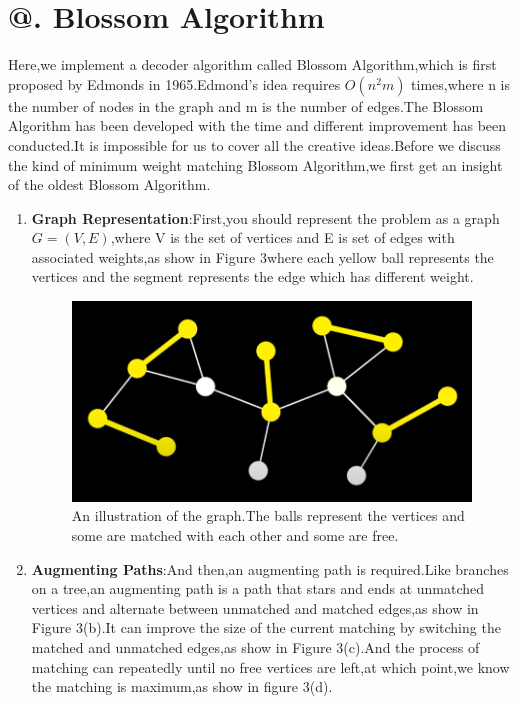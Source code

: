 \documentclass[
	a4paper, %
	10pt, %
	unnumberedsections, %
	twoside, %
]{LTJournalArticle}
\makeatletter
\newcommand{\Rmnum}[1]{\expandafter\@slowromancap\romannumeral #1@}
\makeatother
\begin{document}
\section{\Rmnum{3}. Blossom Algorithm}
	Here,we implement a decoder algorithm called Blossom Algorithm,which is first proposed by Edmonds in 1965.Edmond's idea requires $O(n^2m)$ times,where n is the number of nodes in the graph and m is the number of edges.The Blossom Algorithm has been developed with the time and different improvement has been conducted.It is impossible for us to cover all the creative ideas.Before we discuss the kind of minimum weight matching Blossom Algorithm,we first get an insight of the oldest Blossom Algorithm.
\begin{enumerate}
	\item \textbf{Graph Representation}:First,you should represent the problem as a graph $G=(V,E)$,where V is the set of vertices and E is set of edges with associated weights,as show in Figure 3where each yellow ball represents the vertices and the segment represents the edge which has different weight.
	\begin{figure} %
	\setlength{\abovecaptionskip}{0.cm} %
	\setlength{\abovecaptionskip}{0.cm} 
	\includegraphics[width=\linewidth]{img/blossom algorithm 1.png}
	\caption{An illustration of the graph.The balls represent the vertices and some are matched with each other and some are free.}
	\label{fig:tcanther}
	\end{figure}
	\item \textbf{Augmenting Paths}:And then,an augmenting path is required.Like branches on a tree,an augmenting path is a path that stars and ends at unmatched vertices and alternate between unmatched and matched edges,as show in Figure 3(b).It can improve the size of the current matching by switching the matched and unmatched edges,as show in Figure 3(c).And the process of matching can repeatedly until no free vertices are left,at which point,we know the matching is maximum,as show in figure 3(d). 

\end{enumerate}
\end{document}
